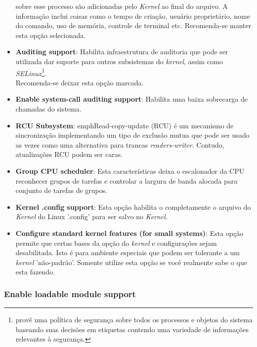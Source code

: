 \documentclass[a4paper,10pt]{article}
\begin{document}
\begin{itemize}
		sobre esse processo são adicionadas pelo \emph{Kernel} ao final do arquivo. A informação inclui coisas como o tempo de criação, 
		usuário proprietário, nome do comando, uso de memória, controle de terminal etc. Recomenda-se manter esta opção selecionada.
	\item \textbf{Auditing support}: Habilita infraestrutura de auditoria que pode ser utilizada dar suporte para outros subsistemas do 
		\emph{kernel}, assim como \emph{SELinux}\footnote{provê uma política de segurança sobre todos os processos e objetos do sistema 
		baseando suas decisões em etiquetas contendo uma variedade de informações relevantes à segurança.}. \\
		Recomenda-se deixar esta opção marcada.
	\item \textbf{Enable system-call auditing support}: Habilita uma baixa sobrecarga de chamadas do sistema.
	\item \textbf{RCU Subsystem}: emph{Read-copy-update} (RCU) é um mecanismo de sincronização implementando um tipo de exclusão mutua que 
	      pode ser usado as vezes como uma alternativa para trancas \emph{readers-writer}. Contudo, atualizações RCU podem ser caras.
	\item \textbf{Group CPU scheduler}: Esta características deixa o escalonador da CPU reconhecer grupos de tarefas e controlar a largura 
		de banda alocada para conjunto de tarefas de grupos. 
	\item \textbf{Kernel .config support}: Esta opção habilita o completamente o arquivo do \emph{Kernel} do Linux '.config' para ser salvo 
	      no \emph{Kernel}. 
	\item \textbf{Configure standard kernel features (for small systems)}: Esta opção permite que certas bases da opção do \emph{kernel} e 
		configurações sejam desabilitada. Isto é para ambiente especiais que podem ser tolerante a um \emph{kernel} 'não-padrão'. Somente 
		utilize esta opção se você realmente sabe o que esta fazendo.
    \end{itemize}

  \subsubsection{Enable loadable module support}
\end{document}
